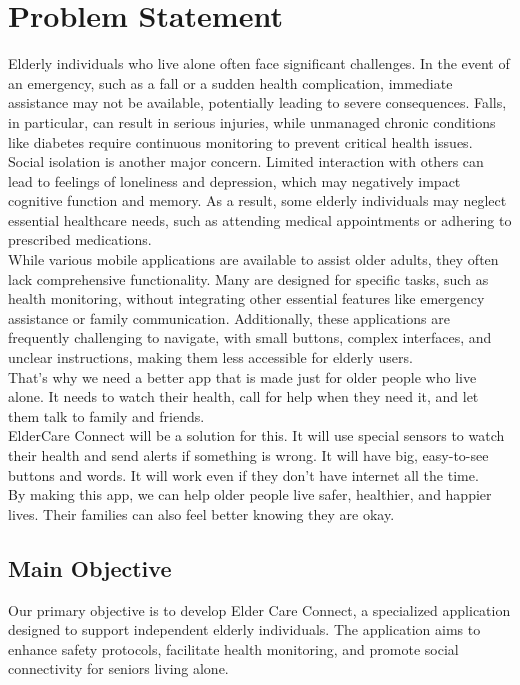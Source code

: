 \section{Problem Statement}
Elderly individuals who live alone often face significant challenges. In the event of an emergency, such as a fall or a sudden health complication, immediate assistance may not be available, potentially leading to severe consequences. Falls, in particular, can result in serious injuries, while unmanaged chronic conditions like diabetes require continuous monitoring to prevent critical health issues.\\

Social isolation is another major concern. Limited interaction with others can lead to feelings of loneliness and depression, which may negatively impact cognitive function and memory. As a result, some elderly individuals may neglect essential healthcare needs, such as attending medical appointments or adhering to prescribed medications.\\

While various mobile applications are available to assist older adults, they often lack comprehensive functionality. Many are designed for specific tasks, such as health monitoring, without integrating other essential features like emergency assistance or family communication. Additionally, these applications are frequently challenging to navigate, with small buttons, complex interfaces, and unclear instructions, making them less accessible for elderly users.\\

That's why we need a better app that is made just for older people who live alone. It needs to watch their health, call for help when they need it, and let them talk to family and friends.\\

ElderCare Connect will be a solution for this. It will use special sensors to watch their health and send alerts if something is wrong. It will have big, easy-to-see buttons and words. It will work even if they don't have internet all the time.\\
By making this app, we can help older people live safer, healthier, and happier lives. Their families can also feel better knowing they are okay.
\subsection{Main Objective}

Our primary objective is to develop Elder Care Connect, a specialized application designed to support independent elderly individuals. The application aims to enhance safety protocols, facilitate health monitoring, and promote social connectivity for seniors living alone.\\

